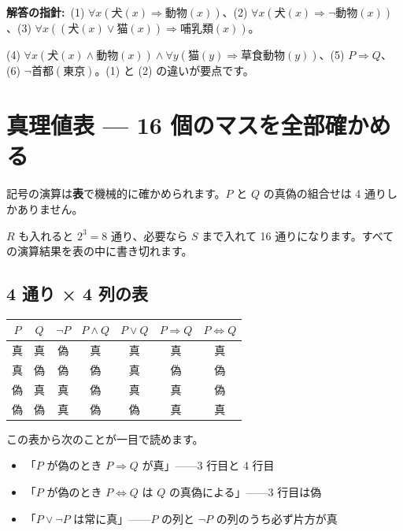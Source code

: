 \documentclass{article}
\begin{document}
\textbf{解答の指針:}\ (1) \(\forall x \left( \mathrm{犬}(x) \Rightarrow \mathrm{動物}(x) \right)\)、(2) \(\forall x \left( \mathrm{犬}(x) \Rightarrow \neg \mathrm{動物}(x) \right)\)、(3) \(\forall x \left( (\mathrm{犬}(x) \lor \mathrm{猫}(x)) \Rightarrow \mathrm{哺乳類}(x) \right)\)。

(4) \(\forall x \left( \mathrm{犬}(x) \land \mathrm{動物}(x) \right) \land \forall y \left( \mathrm{猫}(y) \Rightarrow \mathrm{草食動物}(y) \right)\)、(5) \(P \Rightarrow Q\)、(6) \(\neg \mathrm{首都}(\mathrm{東京})\)。(1) と (2) の違いが要点です。

\section{真理値表 — 16 個のマスを全部確かめる}

記号の演算は\textbf{表}で機械的に確かめられます。\(P\) と \(Q\) の真偽の組合せは 4 通りしかありません。

\(R\) も入れると \(2^3 = 8\) 通り、必要なら \(S\) まで入れて 16 通りになります。すべての演算結果を表の中に書き切れます。

\subsection{4 通り × 4 列の表}

\begin{center}
\begin{tabular}{|c|c|c|c|c|c|c|}
\hline
\(P\) & \(Q\) & \(\neg P\) & \(P \land Q\) & \(P \lor Q\) & \(P \Rightarrow Q\) & \(P \Leftrightarrow Q\) \\
\hline
真 & 真 & 偽 & 真 & 真 & 真 & 真 \\
真 & 偽 & 偽 & 偽 & 真 & 偽 & 偽 \\
偽 & 真 & 真 & 偽 & 真 & 真 & 偽 \\
偽 & 偽 & 真 & 偽 & 偽 & 真 & 真 \\
\hline
\end{tabular}
\end{center}

この表から次のことが一目で読めます。

\begin{itemize}
\item 「\(P\) が偽のとき \(P \Rightarrow Q\) が真」——3 行目と 4 行目
\item 「\(P\) が偽のとき \(P \Leftrightarrow Q\) は \(Q\) の真偽による」——3 行目は偽
\item 「\(P \lor \neg P\) は常に真」——\(P\) の列と \(\neg P\) の列のうち必ず片方が真
\end{itemize}
\end{document}
